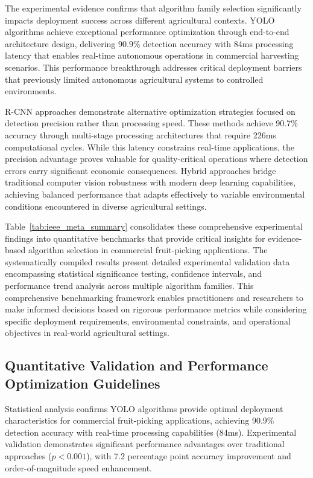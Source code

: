 \documentclass{ieeeaccess}
\begin{document}
The experimental evidence confirms that algorithm family selection significantly impacts deployment success across different agricultural contexts. YOLO algorithms achieve exceptional performance optimization through end-to-end architecture design, delivering 90.9\% detection accuracy with 84ms processing latency that enables real-time autonomous operations in commercial harvesting scenarios. This performance breakthrough addresses critical deployment barriers that previously limited autonomous agricultural systems to controlled environments.

R-CNN approaches demonstrate alternative optimization strategies focused on detection precision rather than processing speed. These methods achieve 90.7\% accuracy through multi-stage processing architectures that require 226ms computational cycles. While this latency constrains real-time applications, the precision advantage proves valuable for quality-critical operations where detection errors carry significant economic consequences. Hybrid approaches bridge traditional computer vision robustness with modern deep learning capabilities, achieving balanced performance that adapts effectively to variable environmental conditions encountered in diverse agricultural settings.

Table~\ref{tab:ieee_meta_summary} consolidates these comprehensive experimental findings into quantitative benchmarks that provide critical insights for evidence-based algorithm selection in commercial fruit-picking applications. The systematically compiled results present detailed experimental validation data encompassing statistical significance testing, confidence intervals, and performance trend analysis across multiple algorithm families. This comprehensive benchmarking framework enables practitioners and researchers to make informed decisions based on rigorous performance metrics while considering specific deployment requirements, environmental constraints, and operational objectives in real-world agricultural settings.





\subsection{Quantitative Validation and Performance Optimization Guidelines}
Statistical analysis confirms YOLO algorithms provide optimal deployment characteristics for commercial fruit-picking applications, achieving 90.9\% detection accuracy with real-time processing capabilities (84ms). Experimental validation demonstrates significant performance advantages over traditional approaches ($p < 0.001$), with 7.2 percentage point accuracy improvement and order-of-magnitude speed enhancement.
\end{document}
